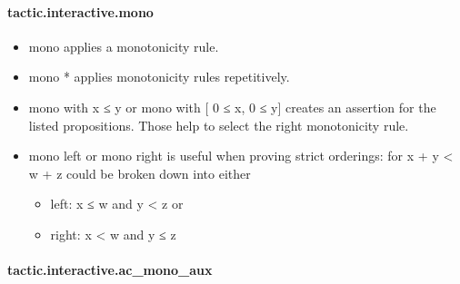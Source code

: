 \documentclass{article}
\begin{document}
\paragraph{tactic.interactive.mono}
\begin{itemize}\item \colorbox[RGB]{253,246,227}{{{{\color[RGB]{101, 123, 131} mono }}}} applies a monotonicity rule.

\item \colorbox[RGB]{253,246,227}{{{{\color[RGB]{101, 123, 131} mono }}}{{{\color[RGB]{181, 137, 0} * }}}} applies monotonicity rules repetitively.

\item \colorbox[RGB]{253,246,227}{{{{\color[RGB]{101, 123, 131} mono  }}}{{{\color[RGB]{133, 153, 0} with }}}{{{\color[RGB]{101, 123, 131}  x  }}}{{{\color[RGB]{181, 137, 0} ≤ }}}{{{\color[RGB]{101, 123, 131}  y }}}} or 
\colorbox[RGB]{253,246,227}{{{{\color[RGB]{101, 123, 131} mono  }}}{{{\color[RGB]{133, 153, 0} with }}}{{{\color[RGB]{101, 123, 131}  {[} }}}{{{\color[RGB]{108, 113, 196} 0 }}}{{{\color[RGB]{101, 123, 131}   }}}{{{\color[RGB]{181, 137, 0} ≤ }}}{{{\color[RGB]{101, 123, 131}  x, }}}{{{\color[RGB]{108, 113, 196} 0 }}}{{{\color[RGB]{101, 123, 131}   }}}{{{\color[RGB]{181, 137, 0} ≤ }}}{{{\color[RGB]{101, 123, 131}  y{]} }}}} creates an assertion for the listed
propositions. Those help to select the right monotonicity rule.

\item \colorbox[RGB]{253,246,227}{{{{\color[RGB]{101, 123, 131} mono left }}}} or 
\colorbox[RGB]{253,246,227}{{{{\color[RGB]{101, 123, 131} mono right }}}} is useful when proving strict orderings:
for 
\colorbox[RGB]{253,246,227}{{{{\color[RGB]{101, 123, 131} x  }}}{{{\color[RGB]{181, 137, 0} + }}}{{{\color[RGB]{101, 123, 131}  y  }}}{{{\color[RGB]{181, 137, 0} < }}}{{{\color[RGB]{101, 123, 131}  w  }}}{{{\color[RGB]{181, 137, 0} + }}}{{{\color[RGB]{101, 123, 131}  z }}}} could be broken down into either
\begin{itemize}\item left:  
\colorbox[RGB]{253,246,227}{{{{\color[RGB]{101, 123, 131} x  }}}{{{\color[RGB]{181, 137, 0} ≤ }}}{{{\color[RGB]{101, 123, 131}  w }}}} and 
\colorbox[RGB]{253,246,227}{{{{\color[RGB]{101, 123, 131} y  }}}{{{\color[RGB]{181, 137, 0} < }}}{{{\color[RGB]{101, 123, 131}  z }}}} or

\item right: 
\colorbox[RGB]{253,246,227}{{{{\color[RGB]{101, 123, 131} x  }}}{{{\color[RGB]{181, 137, 0} < }}}{{{\color[RGB]{101, 123, 131}  w }}}} and 
\colorbox[RGB]{253,246,227}{{{{\color[RGB]{101, 123, 131} y  }}}{{{\color[RGB]{181, 137, 0} ≤ }}}{{{\color[RGB]{101, 123, 131}  z }}}}
\end{itemize}
\end{itemize}\paragraph{tactic.interactive.ac\_mono\_aux}
\end{document}
